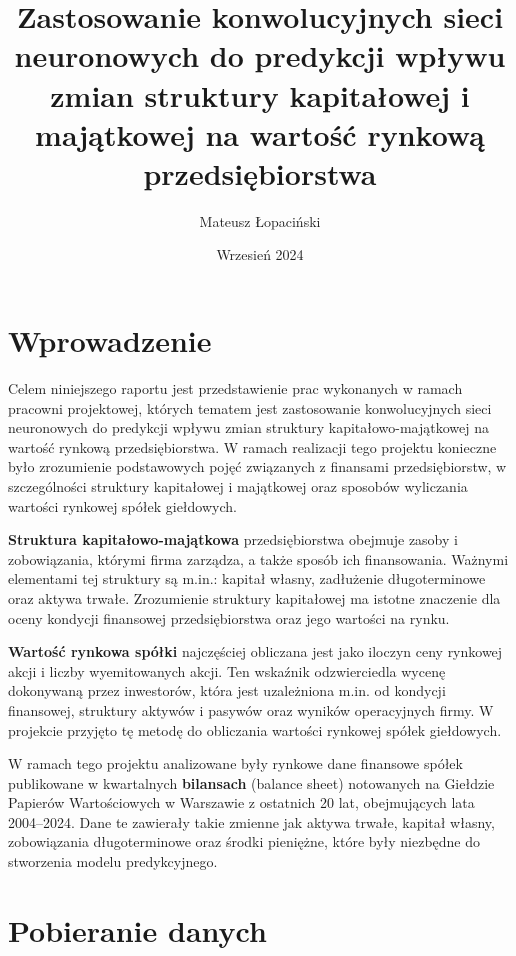 \documentclass[12pt]{article}
\title{Zastosowanie konwolucyjnych sieci neuronowych do predykcji wpływu zmian struktury kapitałowej i majątkowej na wartość rynkową przedsiębiorstwa}
\author{Mateusz Łopaciński}
\date{Wrzesień 2024}
\begin{document}
\maketitle

\tableofcontents
\vspace{1cm} %

\newpage %
\section{Wprowadzenie}

Celem niniejszego raportu jest przedstawienie prac wykonanych w ramach pracowni projektowej, których tematem jest zastosowanie konwolucyjnych sieci neuronowych do predykcji wpływu zmian struktury kapitałowo-majątkowej na wartość rynkową przedsiębiorstwa. W ramach realizacji tego projektu konieczne było zrozumienie podstawowych pojęć związanych z finansami przedsiębiorstw, w szczególności struktury kapitałowej i majątkowej oraz sposobów wyliczania wartości rynkowej spółek giełdowych.

\textbf{Struktura kapitałowo-majątkowa} przedsiębiorstwa obejmuje zasoby i zobowiązania, którymi firma zarządza, a także sposób ich finansowania. Ważnymi elementami tej struktury są m.in.: kapitał własny, zadłużenie długoterminowe oraz aktywa trwałe. Zrozumienie struktury kapitałowej ma istotne znaczenie dla oceny kondycji finansowej przedsiębiorstwa oraz jego wartości na rynku.

\textbf{Wartość rynkowa spółki} najczęściej obliczana jest jako iloczyn ceny rynkowej akcji i liczby wyemitowanych akcji. Ten wskaźnik odzwierciedla wycenę dokonywaną przez inwestorów, która jest uzależniona m.in. od kondycji finansowej, struktury aktywów i pasywów oraz wyników operacyjnych firmy. W projekcie przyjęto tę metodę do obliczania wartości rynkowej spółek giełdowych.

W ramach tego projektu analizowane były rynkowe dane finansowe spółek publikowane w kwartalnych \textbf{bilansach} (balance sheet) notowanych na Giełdzie Papierów Wartościowych w Warszawie z ostatnich 20 lat, obejmujących lata 2004–2024. Dane te zawierały takie zmienne jak aktywa trwałe, kapitał własny, zobowiązania długoterminowe oraz środki pieniężne, które były niezbędne do stworzenia modelu predykcyjnego.

\newpage %
\section{Pobieranie danych}
\end{document}
